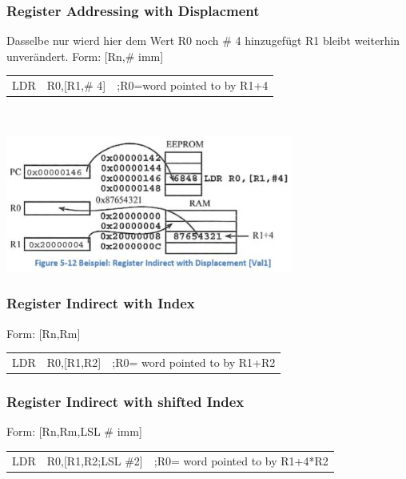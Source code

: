 \begin{multicols}{2}
    \begin{minipage}{\linewidth}
    \subsubsection{Register Addressing with Displacment}
        Dasselbe nur wierd hier dem Wert R0 noch \# 4 hinzugefügt\newline
        R1 bleibt weiterhin unverändert.\newline
        Form: [Rn,\# imm]\newline
        \begin{tabular}{lll}
            LDR & R0,[R1,\# 4]&;R0=word pointed to by R1+4 \\ 
        \end{tabular} \\
    \end{minipage}
    \includegraphics[width=0.9\linewidth]{images/AddressingDisplacment}    
\end{multicols} 

\subsubsection{Register Indirect with Index}
Form: [Rn,Rm]\newline
\begin{tabular}{lll}
   LDR &R0,[R1,R2]  &;R0= word pointed to by R1+R2 \\ 
\end{tabular} 

\subsubsection{Register Indirect with shifted Index}
Form: [Rn,Rm,LSL \# imm]\newline
\begin{tabular}{lll}
    LDR&R0,[R1,R2;LSL \#2]  &;R0= word pointed to by R1+4*R2  \\ 
\end{tabular} 

